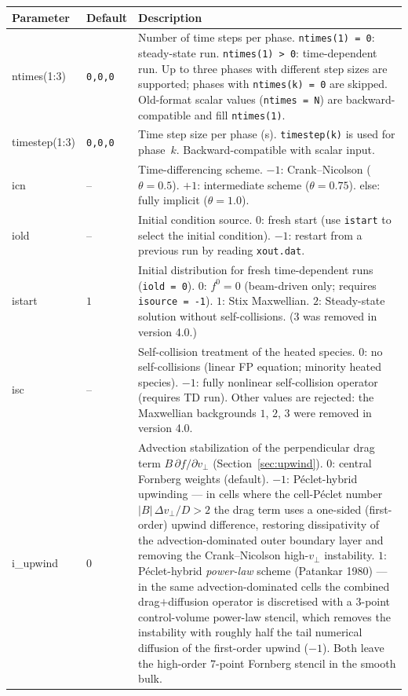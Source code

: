 \documentclass[11pt,a4paper]{article}
\newcommand{\vp}{v_\perp}
\begin{document}
\begin{longtable}{>{\ttfamily}p{3.2cm} p{1.5cm} p{9cm}}
\toprule
\normalfont Parameter & Default & Description \\
\midrule
\endhead
\bottomrule
\endlastfoot

ntimes(1:3) & \texttt{0,0,0} &
  Number of time steps per phase.
  \texttt{ntimes(1) = 0}: steady-state run.
  \texttt{ntimes(1) > 0}: time-dependent run.
  Up to three phases with different step sizes are supported; phases with
  \texttt{ntimes(k) = 0} are skipped.
  Old-format scalar values (\texttt{ntimes = N}) are backward-compatible and
  fill \texttt{ntimes(1)}. \\[4pt]

timestep(1:3) & \texttt{0,0,0} &
  Time step size per phase (s).
  \texttt{timestep(k)} is used for phase~$k$.
  Backward-compatible with scalar input. \\[4pt]

icn & -- &
  Time-differencing scheme.
  $-1$: Crank--Nicolson ($\theta = 0.5$).
  $+1$: intermediate scheme ($\theta = 0.75$).
  else: fully implicit ($\theta = 1.0$). \\[4pt]

iold & -- &
  Initial condition source.
  $0$: fresh start (use \texttt{istart} to select the initial condition).
  $-1$: restart from a previous run by reading \texttt{xout.dat}. \\[4pt]

istart & $1$ &
  Initial distribution for fresh time-dependent runs (\texttt{iold = 0}).
  $0$: $f^0 = 0$ (beam-driven only; requires \texttt{isource = -1}).
  $1$: Stix Maxwellian.
  $2$: Steady-state solution without self-collisions.
  ($3$ was removed in version 4.0.) \\[4pt]

isc & -- &
  Self-collision treatment of the heated species.
  $0$: no self-collisions (linear FP equation; minority heated species).
  $-1$: fully nonlinear self-collision operator (requires TD run).
  Other values are rejected: the Maxwellian backgrounds $1$, $2$, $3$ were removed in
  version 4.0. \\[4pt]

i\_upwind & $0$ &
  Advection stabilization of the perpendicular drag term $B\,\partial f/\partial\vp$
  (Section~\ref{sec:upwind}).
  $0$: central Fornberg weights (default).
  $-1$: P\'eclet-hybrid upwinding --- in cells where the cell-P\'eclet number
  $|B|\,\Delta\vp/D > 2$ the drag term uses a one-sided (first-order) upwind
  difference, restoring dissipativity of the advection-dominated outer boundary
  layer and removing the Crank--Nicolson high-$\vp$ instability.
  $1$: P\'eclet-hybrid \emph{power-law} scheme (Patankar 1980) --- in the same
  advection-dominated cells the combined drag$+$diffusion operator is
  discretised with a 3-point control-volume power-law stencil, which removes the
  instability with roughly half the tail numerical diffusion of the first-order
  upwind ($-1$).  Both leave the high-order 7-point Fornberg stencil in the
  smooth bulk. \\[4pt]


\end{longtable}
\end{document}
